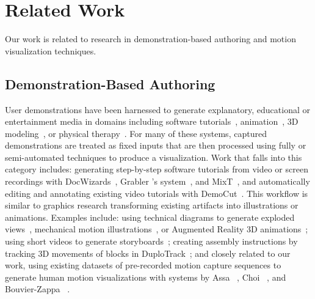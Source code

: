 
\section{Related Work}
Our work is related to research in demonstration-based authoring and motion visualization techniques.

\subsection{Demonstration-Based Authoring}

User demonstrations have been harnessed to generate explanatory, educational or entertainment media in domains including software tutorials~\cite{Bergman:2005:DocWizards,Grabler:2009jj}, animation~\cite{Barnes:2008:VideoPuppetry,held20123d}, 3D modeling~\cite{Zhang:2013:BodyAvatar}, or physical therapy~\cite{Yeager:EECS-2013-91}.
%
For many of these systems, captured demonstrations are treated as fixed inputs that are then processed using fully or semi-automated techniques to produce a visualization.
%
Work that falls into this category includes: generating step-by-step software tutorials from video or screen recordings with DocWizards~\cite{Bergman:2005:DocWizards}, Grabler \ea's system~\cite{Grabler:2009jj}, and MixT~\cite{Chi:2012:MAG:2380116.2380130}, and automatically editing and annotating existing video tutorials with DemoCut~\cite{Chi:2013:DGC:2501988.2502052}.
%
This workflow is similar to graphics research transforming existing artifacts into illustrations or animations.
Examples include: using technical diagrams to generate exploded views~\cite{li2008automated}, mechanical motion illustrations~\cite{mitra2010illustrating}, or Augmented Reality 3D animations~\cite{Mohr:2015:RTD:2702123.2702490}; using short videos to generate storyboards~\cite{goldman2006schematic}; creating assembly instructions by tracking 3D movements of blocks in DuploTrack~\cite{Gupta2012DuploTrack}; and closely related to our work, using existing datasets of pre-recorded motion capture sequences to generate human motion visualizations with systems by Assa \ea~\cite{assa2005action,assa2008motion}, Choi \ea~\cite{choi2012retrieval}, and Bouvier-Zappa \ea~\cite{bouvier2007motion}.
